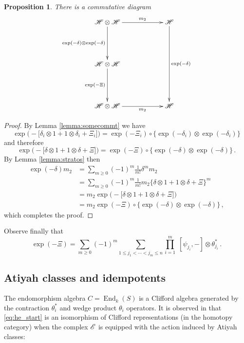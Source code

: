 \documentclass[english,letter paper,12pt,leqno]{article}
\newtheorem{proposition}[theorem]{Proposition}
\theoremstyle{example}
\numberwithin{equation}{section}
\def\be{\begin{equation}}
\def\ee{\end{equation}}
\DeclareMathOperator{\End}{End}
\begin{document}
\begin{proposition} There is a commutative diagram
\be
\xymatrix@C+3pc@R+2pc{
\mathscr{H} \otimes \mathscr{H} \ar[d]_-{\exp(-\delta) \otimes \exp(-\delta)} \ar[r]^-{m_2} & \mathscr{H} \ar[dd]^-{\exp(-\delta)}\\
\mathscr{H} \otimes \mathscr{H} \ar[d]_-{\exp(-\Xi)}\\
\mathscr{H} \otimes \mathscr{H} \ar[r]_-{m_2} & \mathscr{H}
}
\ee
\end{proposition}
\begin{proof}
By Lemma \ref{lemma:somecommt} we have
\[
\exp\big(-\big[ \delta_i \otimes 1 + 1 \otimes \delta_i + \Xi_i \big]\big) = \exp(-\Xi_i) \circ \big\{ \exp(-\delta_i) \otimes \exp(-\delta_i) \big\}
\]
and therefore
\[
\exp\big(-\big[ \delta \otimes 1 + 1 \otimes \delta + \Xi \big]\big) = \exp(-\Xi) \circ \big\{ \exp(-\delta) \otimes \exp(-\delta) \big\}\,.
\]
By Lemma \ref{lemma:stratos} then
\begin{align*}
\exp(-\delta) m_2 &= \sum_{m \ge 0} (-1)^m \frac{1}{m!} \delta^m m_2\\
&= \sum_{m \ge 0} (-1)^m \frac{1}{m!} m_2 \big\{ \delta \otimes 1 + 1 \otimes \delta + \Xi \big\}^m\\
&= m_2 \exp\big(-\big[ \delta \otimes 1 + 1 \otimes \delta + \Xi \big] \big)\\
&= m_2 \exp(-\Xi) \circ \big\{ \exp(-\delta) \otimes \exp(-\delta) \big\}\,,
\end{align*}
which completes the proof.
\end{proof}

Observe finally that
\be
\exp(-\Xi) = \sum_{m \ge 0} (-1)^m \sum_{1 \le j_1 < \cdots < j_m \le n} \prod_{i=1}^m \;[\psi_{j_i},-] \otimes \theta_{j_i}^*\,.
\ee

\subsection{Atiyah classes and idempotents}

The endomorphism algebra $C = \End_k(S)$ is a Clifford algebra generated by the contraction $\theta_i^*$ and wedge product $\theta_i$ operators. It is observed in \cite{murfet} that \eqref{eq:he_start} is an isomorphism of Clifford representations (in the homotopy category) when the complex $\mathscr{E}$ is equipped with the action induced by Atiyah classes:
\end{document}
